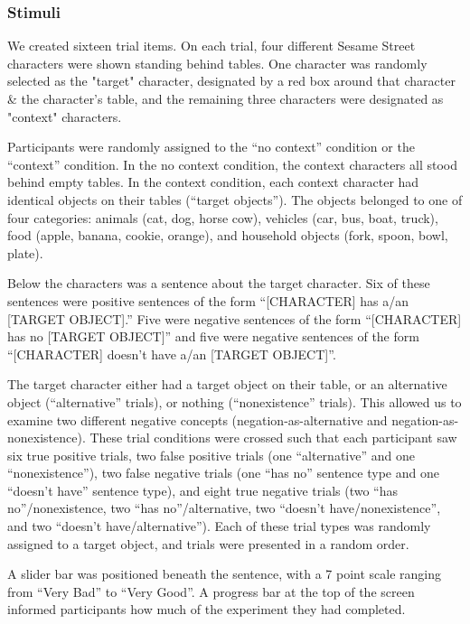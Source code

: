\documentclass[10pt,letterpaper]{article}
\begin{document}
\subsubsection{Stimuli}
We created sixteen trial items.  On each trial, four different Sesame Street characters were shown standing behind tables.  One character was randomly selected as the "target" character, designated by a red box around that character \& the character's table, and the remaining three characters were designated as "context" characters.

Participants were randomly assigned to the ``no context'' condition or the ``context'' condition.  In the no context condition, the context characters all stood behind empty tables.  In the context condition, each context character had identical objects on their tables (``target objects'').  The objects belonged to one of four categories: animals (cat, dog, horse cow), vehicles (car, bus, boat, truck), food (apple, banana, cookie, orange), and household objects (fork, spoon, bowl, plate).  

Below the characters was a sentence about the target character.  Six of these sentences were positive sentences of the form ``[CHARACTER] has a/an [TARGET OBJECT].''  Five were negative sentences of the form ``[CHARACTER] has no [TARGET OBJECT]'' and five were negative sentences of the form ``[CHARACTER] doesn't have a/an [TARGET OBJECT]''.  

The target character either had a target object on their table, or an alternative object (``alternative'' trials), or nothing (``nonexistence'' trials).  This allowed us to examine two different negative concepts (negation-as-alternative and negation-as-nonexistence).  These trial conditions were crossed such that each participant saw six true positive trials, two false positive trials (one ``alternative'' and one ``nonexistence''), two false negative trials (one ``has no'' sentence type and one ``doesn't have'' sentence type), and eight true negative trials (two ``has no''/nonexistence, two ``has no''/alternative, two ``doesn't have/nonexistence'', and two ``doesn't have/alternative'').  Each of these trial types was randomly assigned to a target object, and trials were presented in a random order.

A slider bar was positioned beneath the sentence, with a 7 point scale ranging from ``Very Bad'' to ``Very Good''.  A progress bar at the top of the screen informed participants how much of the experiment they had completed. 
\end{document}
